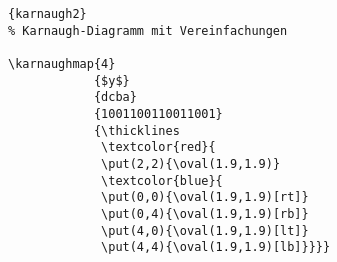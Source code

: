 \begin{lstlisting}[caption=Karnaugh-Diagramm mit Vereinfachungen]{karnaugh2}
% Karnaugh-Diagramm mit Vereinfachungen

\karnaughmap{4}
            {$y$}
            {dcba}
            {1001100110011001}
            {\thicklines
             \textcolor{red}{
             \put(2,2){\oval(1.9,1.9)}
             \textcolor{blue}{
             \put(0,0){\oval(1.9,1.9)[rt]}
             \put(0,4){\oval(1.9,1.9)[rb]}
             \put(4,0){\oval(1.9,1.9)[lt]}
             \put(4,4){\oval(1.9,1.9)[lb]}}}}
\end{lstlisting}